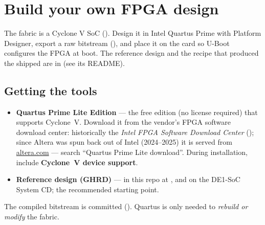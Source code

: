 \section{Build your own FPGA design}
The fabric is a Cyclone V SoC (). Design it in Intel Quartus
Prime with Platform Designer, export a raw bitstream (), and place it on
the card so U-Boot configures the FPGA at boot. The reference design and the
recipe that produced the shipped  are in
 (see its README).

\subsection{Getting the tools}
\begin{itemize}
  \item \textbf{Quartus Prime Lite Edition} --- the free edition (no license
        required) that supports Cyclone~V. Download it from the vendor's FPGA
        software download center: historically the \emph{Intel FPGA Software
        Download Center} (); since Altera was spun
        back out of Intel (2024--2025) it is served from
        \href{https://www.altera.com}{altera.com} --- search ``Quartus Prime Lite
        download''. During installation, include \textbf{Cyclone~V device support}.
  \item \textbf{Reference design (GHRD)} --- in this repo at
        , and on the DE1-SoC System CD; the recommended
        starting point.
\end{itemize}
\begin{note}
The compiled bitstream is committed ().
Quartus is only needed to \emph{rebuild or modify} the fabric.
\end{note}

